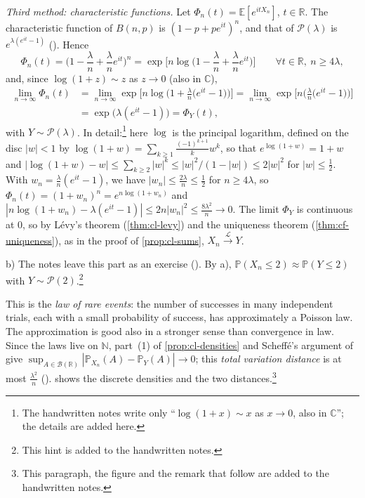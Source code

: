 \begin{example}
\emph{Third method: characteristic functions.} Let $\Phi_n(t)=\mathbb E[e^{itX_n}]$,
$t\in\mathbb R$. The characteristic function of $B(n,p)$ is $(1-p+pe^{it})^n$, and that of
$\mathcal P(\lambda)$ is $e^{\lambda(e^{it}-1)}$ (). Hence
\[
  \Phi_n(t)=\Big(1-\frac\lambda n+\frac\lambda ne^{it}\Big)^n
  =\exp\Big[n\log\Big(1-\frac\lambda n+\frac\lambda ne^{it}\Big)\Big]\qquad\forall t\in\mathbb R,\ n\ge4\lambda,
\]
and, since $\log(1+z)\sim z$ as $z\to0$ (also in $\mathbb C$),
\[
\begin{aligned}
  \lim_{n\to\infty}\Phi_n(t)&=\lim_{n\to\infty}\exp\Big[n\log\Big(1+\frac\lambda n\big(e^{it}-1\big)\Big)\Big]
  =\lim_{n\to\infty}\exp\Big[n\Big(\frac\lambda n\big(e^{it}-1\big)\Big)\Big]\\
  &=\exp\big(\lambda(e^{it}-1)\big)=\Phi_Y(t),
\end{aligned}
\]
with $Y\sim\mathcal P(\lambda)$. In detail:\footnote{The handwritten notes write only
``$\log(1+x)\sim x$ as $x\to0$, also in $\mathbb C$''; the details are added here.} here $\log$
is the principal logarithm, defined on the disc $|w|<1$ by
$\log(1+w)=\sum_{k\ge1}\frac{(-1)^{k+1}}kw^k$, so that $e^{\log(1+w)}=1+w$ and
$|\log(1+w)-w|\le\sum_{k\ge2}|w|^k\le|w|^2/(1-|w|)\le2|w|^2$ for $|w|\le\frac12$. With
$w_n=\frac\lambda n(e^{it}-1)$, we have $|w_n|\le\frac{2\lambda}n\le\frac12$ for $n\ge4\lambda$,
so $\Phi_n(t)=(1+w_n)^n=e^{n\log(1+w_n)}$ and
$|n\log(1+w_n)-\lambda(e^{it}-1)|\le2n|w_n|^2\le\frac{8\lambda^2}n\to0$. The limit
$\Phi_Y$ is continuous at $0$, so by L\'evy's theorem (\cref{thm:cl-levy}) and the uniqueness
theorem (\cref{thm:cf-uniqueness}), as in the proof of \cref{prop:cl-sums},
$X_n\xrightarrow{\mathcal L}Y$.

b) The notes leave this part as an exercise (). By a),
$\mathbb P(X_n\le2)\approx\mathbb P(Y\le2)$ with $Y\sim\mathcal P(2)$.\footnote{This hint is
added to the handwritten notes.}
\end{example}

This is the \emph{law of rare events}: the number of successes in many independent trials, each
with a small probability of success, has approximately a Poisson law. The approximation is good
also in a stronger sense than convergence in law. Since the laws live on $\mathbb N$, part~(1) of
\cref{prop:cl-densities} and Scheff\'e's argument of  give
$\sup_{A\in\mathcal B(\mathbb R)}|\mathbb P_{X_n}(A)-\mathbb P_Y(A)|\to0$; this \emph{total variation
distance} is at most $\frac{\lambda^2}n$ (). 
shows the discrete densities and the two distances.\footnote{This paragraph, the figure and
the remark that follow are added to the handwritten notes.}

